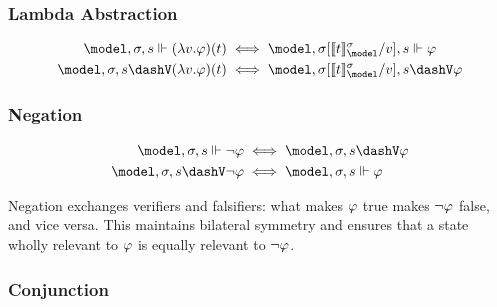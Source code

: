 \documentclass[../LogosReference.tex]{subfiles}
\begin{document}
\subsubsection{Lambda Abstraction}\label{sec:lambda-abstraction}

\begin{definition}\label{def:lambda-verification}
	\begin{align}
		\model, \assignment, s \verifies (\lambda v.\metaA)(t)  & \iff \model, \assignsub{\sem{t}^\assignment_\model}{v}, s \verifies \metaA  \\
		\model, \assignment, s \falsifies (\lambda v.\metaA)(t) & \iff \model, \assignsub{\sem{t}^\assignment_\model}{v}, s \falsifies \metaA
	\end{align}
\end{definition}

\subsubsection{Negation}\label{sec:negation}

\begin{definition}\label{def:negation-verification}
	\begin{align}
		\model, \assignment, s \verifies \neg\metaA  & \iff \model, \assignment, s \falsifies \metaA \\
		\model, \assignment, s \falsifies \neg\metaA & \iff \model, \assignment, s \verifies \metaA
	\end{align}
\end{definition}

\begin{remark}
Negation exchanges verifiers and falsifiers: what makes $\varphi$ true makes $\neg\varphi$ false, and vice versa.
This maintains bilateral symmetry and ensures that a state wholly relevant to $\varphi$ is equally relevant to $\neg\varphi$.
\end{remark}

\subsubsection{Conjunction}\label{sec:conjunction}
\end{document}
